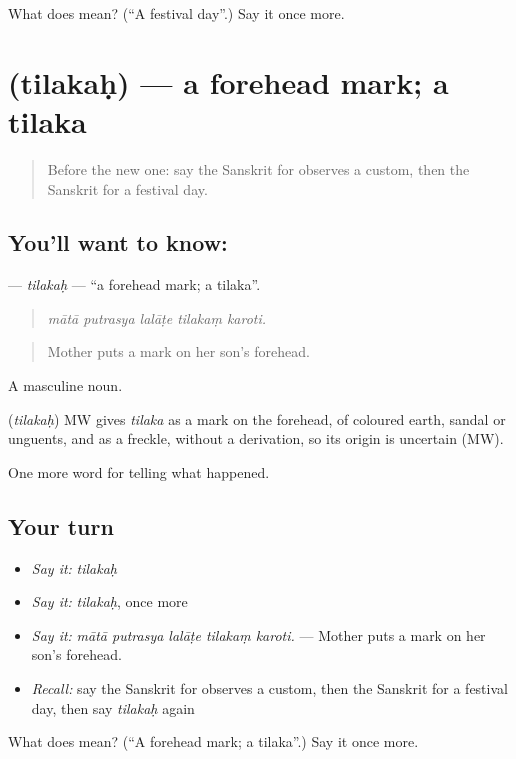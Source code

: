 \begin{tcolorbox}[breakable,colback=teal!4,colframe=teal!35!black,title={Before you move on}]
What does  mean? (\textquotedblleft{}A festival day\textquotedblright{}.) Say it once more.
\end{tcolorbox}
\section[\texorpdfstring{\sk{तिलकः} (tilakaḥ)}{तिलकः (tilakaḥ)}]{ (tilakaḥ) — a forehead mark; a tilaka}

\label{lesson:SA-C330-tilakah}



\begin{quote}
Before the new one: say the Sanskrit for observes a custom, then the Sanskrit for a festival day.
\end{quote}

\subsection*{You'll want to know: }
\textbf{} — \emph{tilakaḥ} — \textquotedblleft{}a forehead mark; a tilaka\textquotedblright{}.

\begin{quote}
    
\end{quote}

\begin{quote}
\emph{mātā putrasya lalāṭe tilakaṃ karoti.}
\end{quote}

\begin{quote}
Mother puts a mark on her son's forehead.
\end{quote}

A masculine noun.

\begin{cousinweb}
\textbf{} (\emph{tilakaḥ}) MW gives \emph{tilaka} as a mark on the forehead, of coloured earth, sandal or unguents, and as a freckle, without a derivation, so its origin is uncertain (MW).
\end{cousinweb}

\begin{grammarlens}[title={What you've built}]
One more word for telling what happened.
\end{grammarlens}

\subsection*{Your turn}
\begin{itemize}
\raggedright
  \item \emph{Say it:} \emph{tilakaḥ}
  \item \emph{Say it:} \emph{tilakaḥ}, once more
  \item \emph{Say it:} \emph{mātā putrasya lalāṭe tilakaṃ karoti.} — Mother puts a mark on her son's forehead.
  \item \emph{Recall:} say the Sanskrit for observes a custom, then the Sanskrit for a festival day, then say \emph{tilakaḥ} again
\end{itemize}

\begin{tcolorbox}[breakable,colback=teal!4,colframe=teal!35!black,title={Before you move on}]
What does  mean? (\textquotedblleft{}A forehead mark; a tilaka\textquotedblright{}.) Say it once more.
\end{tcolorbox}
